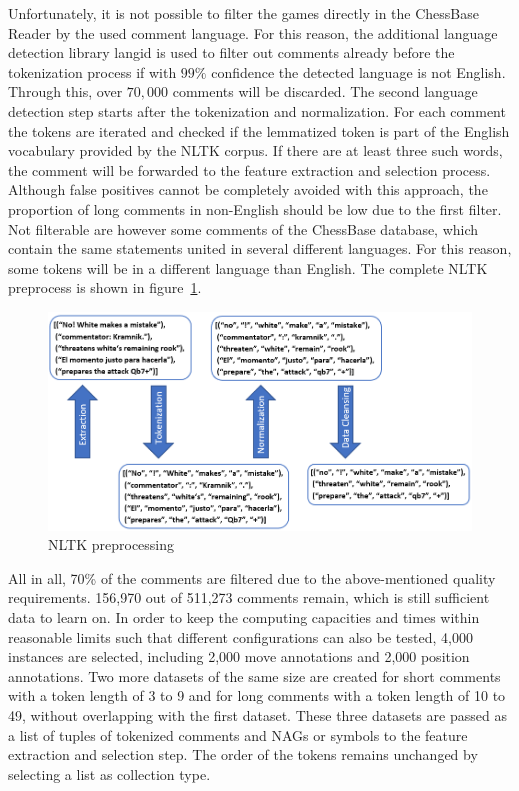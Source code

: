 \documentclass[article,type=msc,colorback,accentcolor=tud7b]{tudthesis}
\begin{document}
    Unfortunately, it is not possible to filter the games directly in the ChessBase Reader by the used comment language. For this reason, the additional language detection library langid is used to filter out comments already before the tokenization process if with $99\%$ confidence the detected language is not English. Through this, over $70,000$ comments will be discarded. The second language detection step starts after the tokenization and normalization. For each comment the tokens are iterated and checked if the lemmatized token is part of the English vocabulary provided by the NLTK corpus. If there are at least three such words, the comment will be forwarded to the feature extraction and selection process. Although false positives cannot be completely avoided with this approach, the proportion of long comments in non-English should be low due to the first filter. Not filterable are however some comments of the ChessBase database, which contain the same statements united in several different languages. For this reason, some tokens will be in a different language than English. The complete NLTK preprocess is shown in figure~\ref{fig:nltk_preprocessing}.

    \begin{figure}[H]
      \centering
      \includegraphics[scale=0.9]{images/nltk_preprocessing}
      \caption{NLTK preprocessing}
      \label{fig:nltk_preprocessing}
	\end{figure}  
    
    All in all, 70\% of the comments are filtered due to the above-mentioned quality requirements. 156,970 out of 511,273 comments remain, which is still sufficient data to learn on. In order to keep the computing capacities and times within reasonable limits such that different configurations can also be tested, 4,000 instances are selected, including 2,000 move annotations and 2,000 position annotations. Two more datasets of the same size are created for short comments with a token length of 3 to 9 and for long comments with a token length of 10 to 49, without overlapping with the first dataset. These three datasets are passed as a list of tuples of tokenized comments and NAGs or symbols to the feature extraction and selection step. The order of the tokens remains unchanged by selecting a list as collection type. \\\\
\end{document}
